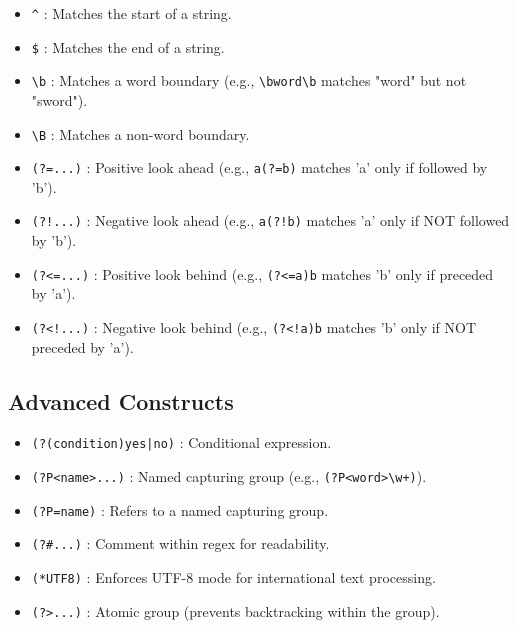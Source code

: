 \begin{itemize}

    \item \texttt{\^} : Matches the start of a string.

    \item \texttt{\$} : Matches the end of a string.

    \item \texttt{\textbackslash b} : Matches a word boundary (e.g., \texttt{\textbackslash bword\textbackslash b} matches "word" but not "sword").

    \item \texttt{\textbackslash B} : Matches a non-word boundary.

    \item \texttt{(?=...)} : Positive look ahead (e.g., \texttt{a(?=b)} matches 'a' only if followed by 'b').

    \item \texttt{(?!...)} : Negative look ahead (e.g., \texttt{a(?!b)} matches 'a' only if NOT followed by 'b').

    \item \texttt{(?<=...)} : Positive look behind (e.g., \texttt{(?<=a)b} matches 'b' only if preceded by 'a').

    \item \texttt{(?<!...)} : Negative look behind (e.g., \texttt{(?<!a)b} matches 'b' only if NOT preceded by 'a').

\end{itemize}

\subsection{Advanced Constructs}

\begin{itemize}

    \item \texttt{(?(condition)yes|no)} : Conditional expression.

    \item \texttt{(?P<name>...)} : Named capturing group (e.g., \texttt{(?P<word>\textbackslash w+)}).

    \item \texttt{(?P=name)} : Refers to a named capturing group.

    \item \texttt{(?\#...)} : Comment within regex for readability.

    \item \texttt{(*UTF8)} : Enforces UTF-8 mode for international text processing.

    \item \texttt{(?>...)} : Atomic group (prevents backtracking within the group).

\end{itemize}

